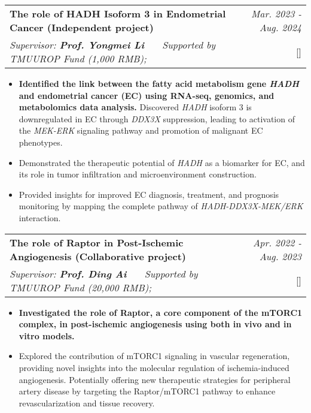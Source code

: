 \documentclass[a4paper,11pt]{article}
\makeatletter
\newcommand{\resumeProject}[4]{
\vspace{0.5mm}\item
    \begin{tabular*}{0.98\textwidth}[t]{l@{\extracolsep{\fill}}r}
        \textbf{#1} & \textit{\footnotesize{#3}} \\
        \footnotesize{\textit{#2}} & \footnotesize{#4}
    \end{tabular*}
    \vspace{-2.4mm}
}
\newcommand{\resumeItemListStart}{\begin{itemize}[leftmargin=*,labelsep=1mm,itemsep=0.5mm]}
\newcommand{\resumeItemListEnd}{\end{itemize}\vspace{-2mm}}
\makeatother
\begin{document}
\begin{justify}
\resumeProject
  {The role of HADH Isoform 3 in Endometrial Cancer \small{(Independent project)}}
  {Supervisor: \textbf{Prof. Yongmei Li} \ \ \ Supported by TMUUROP Fund (1,000 RMB);}
  {Mar. 2023 - Aug. 2024}
  {{}[\href{https://github.com/wunaiwuhuang/materials/tree/main/Award\_and\_honour\%E8\%8E\%B7\%E5\%A5\%96\%E8\%AF\%81\%E6\%98\%8E/innovation\%20and\%20Entrepreneurship\%20Competition}{\textcolor{darkblue}{\faGithub}}]}
\resumeItemListStart
  \item \textbf{Identified the link between the fatty acid metabolism gene \textit{HADH} and endometrial cancer (EC) using RNA-seq, genomics, and metabolomics data analysis.} Discovered \textit{HADH} isoform 3 is downregulated in EC through \textit{DDX3X} suppression, leading to activation of the \textit{MEK-ERK} signaling pathway and promotion of malignant EC phenotypes.
  \item Demonstrated the therapeutic potential of \textit{HADH} as a biomarker for EC, and its role in tumor infiltration and microenvironment construction.
  \item Provided insights for improved EC diagnosis, treatment, and prognosis monitoring by mapping the complete pathway of \textit{HADH-DDX3X-MEK/ERK} interaction.
\resumeItemListEnd

\resumeProject
  {The role of Raptor in Post-Ischemic Angiogenesis \small{(Collaborative project)}}
  {Supervisor: \textbf{Prof. Ding Ai} \ \ \ Supported by TMUUROP Fund (20,000 RMB);}
  {Apr. 2022 - Aug. 2023}
  {{}[\href{https://github.com/wunaiwuhuang/materials/tree/main/Award\_and\_honour\%E8\%8E\%B7\%E5\%A5\%96\%E8\%AF\%81\%E6\%98\%8E/innovation\%20and\%20Entrepreneurship\%20Competition}{\textcolor{darkblue}{\faGithub}}]}
\resumeItemListStart
  \item \textbf{Investigated the role of Raptor, a core component of the mTORC1 complex, in post-ischemic angiogenesis using both in vivo and in vitro models.}
  \item Explored the contribution of mTORC1 signaling in vascular regeneration, providing novel insights into the molecular regulation of ischemia-induced angiogenesis. Potentially offering new therapeutic strategies for peripheral artery disease by targeting the Raptor/mTORC1 pathway to enhance revascularization and tissue recovery.
\resumeItemListEnd


\end{justify}
\end{document}
